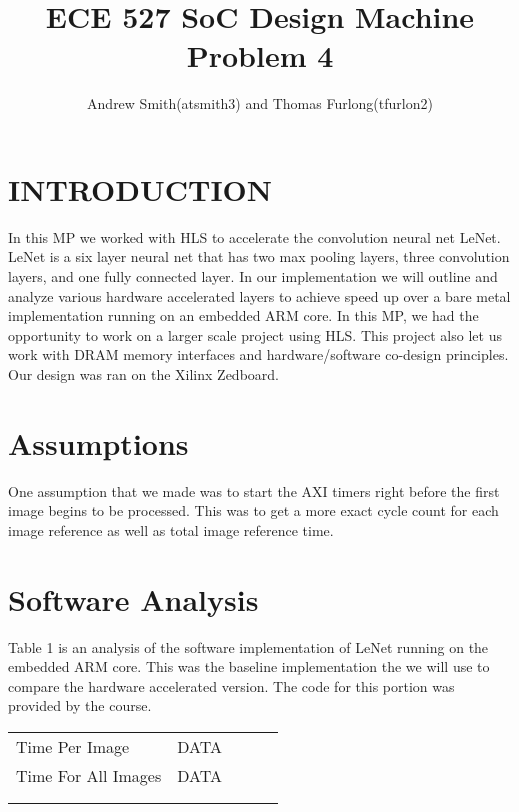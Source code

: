 \documentclass{document}  %
\title{\LARGE \bf ECE 527 SoC Design Machine Problem 4}
\author{Andrew Smith(atsmith3) and Thomas Furlong(tfurlon2)}%
\begin{document}
\maketitle
\thispagestyle{empty}
\pagestyle{empty}


\section{INTRODUCTION}
In this MP we worked with HLS to accelerate the convolution neural net LeNet. LeNet is a six layer neural net that has two max pooling layers, three convolution layers, and one fully connected layer. In our implementation we will outline and analyze various hardware accelerated layers to achieve speed up over a bare metal implementation running on an embedded ARM core. In this MP, we had the opportunity to work on a larger scale project using HLS. This project also let us work with DRAM memory interfaces and hardware/software co-design principles. Our design was ran on the Xilinx Zedboard. 


\section{Assumptions}
One assumption that we made was to start the AXI timers right before the first image begins to be processed. This was to get a more exact cycle count for each image reference as well as total image reference time. 

\section{Software Analysis}
Table 1 is an analysis of the software implementation of LeNet running on the embedded ARM core. This was the baseline implementation the we will use to compare the hardware accelerated version. The code for this portion was provided by the course. 

\begin{table}[H]
\begin{center}
\begin{tabular}{lllll}
\cline{1-2}
\multicolumn{1}{|l|}{Time Per Image}      & \multicolumn{1}{l|}{DATA} &  &  &  \\ \cline{1-2}
\multicolumn{1}{|l|}{Time For All Images} & \multicolumn{1}{l|}{DATA} &  &  &  \\ \cline{1-2}
                                          &                       &  &  &  \\
                                          &                       &  &  & 
\end{tabular}
\end{center}
\end{table}
\end{document}
